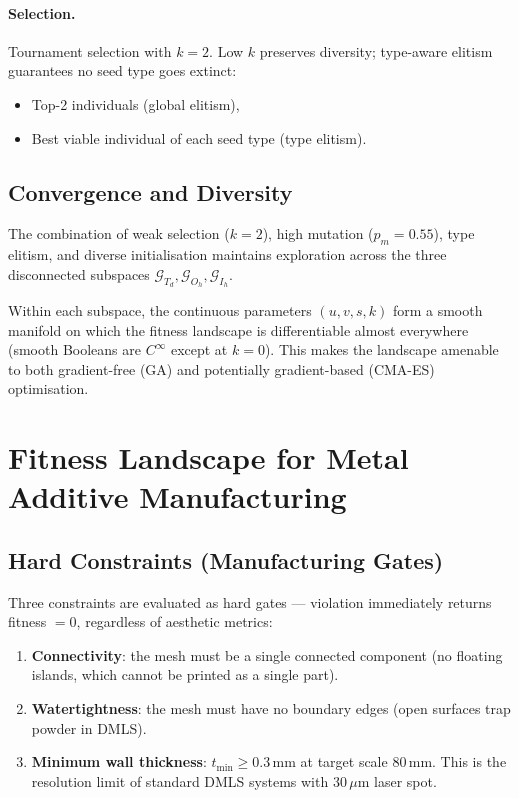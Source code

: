 \documentclass[11pt, a4paper]{article}
\newcommand{\Td}{T_d}
\newcommand{\Oh}{O_h}
\newcommand{\Ih}{I_h}
\begin{document}
\paragraph{Selection.}
Tournament selection with $k=2$. Low $k$ preserves diversity; type-aware
elitism guarantees no seed type goes extinct:
\begin{itemize}
  \item Top-2 individuals (global elitism),
  \item Best viable individual of each seed type (type elitism).
\end{itemize}

\subsection{Convergence and Diversity}

The combination of weak selection ($k=2$), high mutation ($p_m = 0.55$), type
elitism, and diverse initialisation maintains exploration across the three
disconnected subspaces $\mathcal{G}_{\Td}, \mathcal{G}_{\Oh}, \mathcal{G}_{\Ih}$.

Within each subspace, the continuous parameters $(u,v,s,k)$ form a smooth
manifold on which the fitness landscape is differentiable almost everywhere
(smooth Booleans are $C^\infty$ except at $k=0$). This makes the landscape
amenable to both gradient-free (GA) and potentially gradient-based (CMA-ES)
optimisation.

\section{Fitness Landscape for Metal Additive Manufacturing}
\label{sec:fitness}

\subsection{Hard Constraints (Manufacturing Gates)}

Three constraints are evaluated as hard gates — violation immediately returns
fitness $= 0$, regardless of aesthetic metrics:

\begin{enumerate}
  \item \textbf{Connectivity}: the mesh must be a single connected component (no floating islands, which cannot be printed as a single part).
  \item \textbf{Watertightness}: the mesh must have no boundary edges (open surfaces trap powder in DMLS).
  \item \textbf{Minimum wall thickness}: $t_{\min} \geq 0.3\,\mathrm{mm}$ at target scale $80\,\mathrm{mm}$. This is the resolution limit of standard DMLS systems with $30\,\mu\mathrm{m}$ laser spot.
\end{enumerate}
\end{document}
